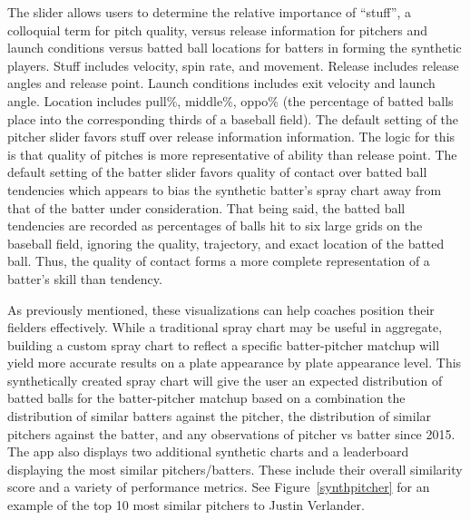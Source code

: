 \documentclass[11pt]{article}
\begin{document}

The slider allows users to determine the relative importance of ``stuff'', a colloquial term for pitch quality, versus release information for pitchers and launch conditions versus batted ball locations for batters in forming the synthetic players. Stuff includes velocity, spin rate, and movement. Release includes release angles and release point. Launch conditions includes exit velocity and launch angle. Location includes pull\%, middle\%, oppo\% (the percentage of batted balls place into the corresponding thirds of a baseball field). The default setting of the pitcher slider favors stuff over release information information. The logic for this is that quality of pitches is more representative of ability than release point. The default setting of the batter slider favors quality of contact over batted ball tendencies which appears to bias the synthetic batter's spray chart away from that of the batter under consideration. That being said, the batted ball tendencies are recorded as percentages of balls hit to six large grids on the baseball field, ignoring the quality, trajectory, and exact location of the batted ball. Thus, the quality of contact forms a more complete representation of a batter's skill than tendency.

As previously mentioned, these visualizations can help coaches position their fielders effectively. While a traditional spray chart may be useful in aggregate, building a custom spray chart to reflect a specific batter-pitcher matchup will yield more accurate results on a plate appearance by plate appearance level. This synthetically created spray chart will give the user an expected distribution of batted balls for the batter-pitcher matchup based on a combination the distribution of similar batters against the pitcher, the distribution of similar pitchers against the batter, and any observations of pitcher vs batter since 2015. The app also displays two additional synthetic charts and a leaderboard displaying the most similar pitchers/batters. These include their overall similarity score and a variety of performance metrics. See Figure~\ref{synthpitcher} for an example of the top 10 most similar pitchers to Justin Verlander.
\end{document}
